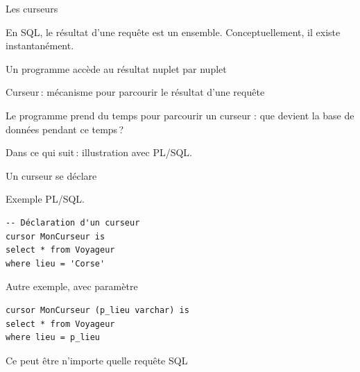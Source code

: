 
\begin{frame}[fragile]{Les curseurs}

En SQL, le résultat d'une requête est un \alert{ensemble}. Conceptuellement,
il existe instantanément.

\vfill

Un programme accède au résultat nuplet par nuplet

\vfill


\alert{Curseur}\,: mécanisme  pour parcourir le résultat d'une requête

\vfill


Le programme prend du temps pour parcourir un curseur : \alert{que devient la base de données pendant ce temps}\,?

\vfill

Dans ce qui suit\,: illustration avec PL/SQL.

\end{frame}


\begin{frame}[fragile]{Un curseur se déclare}

Exemple PL/SQL.

\vfill

\begin{small}
\begin{verbatim}
-- Déclaration d'un curseur
cursor MonCurseur is
select * from Voyageur
where lieu = 'Corse'
\end{verbatim}
\end{small}

\vfill

Autre exemple, avec paramètre

\vfill

\begin{small}
\begin{verbatim}
cursor MonCurseur (p_lieu varchar) is
select * from Voyageur
where lieu = p_lieu
\end{verbatim}
\end{small}
\vfill

Ce peut être n'importe quelle requête SQL
\end{frame}

